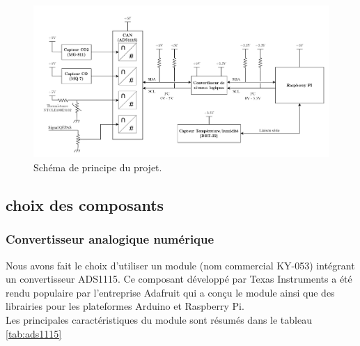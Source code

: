 \documentclass[a4paper]{report}
\begin{document}
	\begin{figure}[h]	
		\begin{center}			
		\includegraphics[width=1.2\textwidth]{systeme_global}
		\caption{Schéma de principe du projet.}
		\label{schema:archi}				
		\end{center}
	\end{figure}	

	
	\subsection{choix des composants}
	
\subsubsection{Convertisseur analogique numérique}
	Nous avons fait le choix d'utiliser un module (nom commercial KY-053) intégrant un convertisseur ADS1115. Ce composant développé par Texas Instruments a été rendu populaire par l'entreprise Adafruit qui a conçu le module ainsi que des librairies pour les plateformes Arduino et Raspberry Pi.\\
	Les principales caractéristiques du module sont résumés dans le tableau \ref{tab:ads1115}
\end{document}

